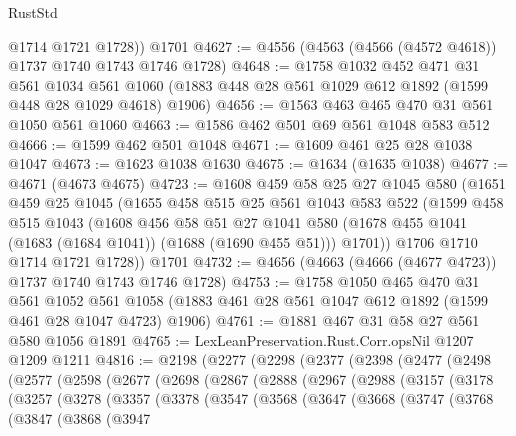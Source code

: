 \begin{lexlean}{RustStd}
\begin{coremodule}
        @1714
        @1721
        @1728))
    @1701
@4627 := @4556 (@4563 (@4566 (@4572 @4618)) @1737 @1740 @1743 @1746 @1728)
@4648 := @1758
    @1032
    @452
    @471
    @31
    @561
    @1034
    @561
    @1060
    (@1883 @448 @28 @561 @1029 @612 @1892 (@1599 @448 @28 @1029 @4618) @1906)
@4656 := @1563 @463 @465 @470 @31 @561 @1050 @561 @1060
@4663 := @1586 @462 @501 @69 @561 @1048 @583 @512
@4666 := @1599 @462 @501 @1048
@4671 := @1609 @461 @25 @28 @1038 @1047
@4673 := @1623 @1038 @1630
@4675 := @1634 (@1635 @1038)
@4677 := @4671 (@4673 @4675)
@4723 := @1608
    @459
    @58
    @25
    @27
    @1045
    @580
    (@1651
      @459
      @25
      @1045
      (@1655
        @458
        @515
        @25
        @561
        @1043
        @583
        @522
        (@1599
          @458
          @515
          @1043
          (@1608
            @456
            @58
            @51
            @27
            @1041
            @580
            (@1678 @455 @1041 (@1683 (@1684 @1041)) (@1688 (@1690 @455 @51)))
            @1701))
        @1706
        @1710
        @1714
        @1721
        @1728))
    @1701
@4732 := @4656 (@4663 (@4666 (@4677 @4723)) @1737 @1740 @1743 @1746 @1728)
@4753 := @1758
    @1050
    @465
    @470
    @31
    @561
    @1052
    @561
    @1058
    (@1883 @461 @28 @561 @1047 @612 @1892 (@1599 @461 @28 @1047 @4723) @1906)
@4761 := @1881 @467 @31 @58 @27 @561 @580 @1056 @1891
@4765 := LexLeanPreservation.Rust.Corr.opsNil @1207 @1209 @1211
@4816 := @2198
    (@2277
      (@2298
        (@2377
          (@2398
            (@2477
              (@2498
                (@2577
                  (@2598
                    (@2677
                      (@2698
                        (@2867
                          (@2888
                            (@2967
                              (@2988
                                (@3157
                                  (@3178
                                    (@3257
                                      (@3278
                                        (@3357
                                          (@3378
                                            (@3547
                                              (@3568
                                                (@3647
                                                  (@3668
                                                    (@3747
                                                      (@3768
                                                        (@3847
                                                          (@3868
                                                            (@3947

\end{coremodule}
\end{lexlean}
